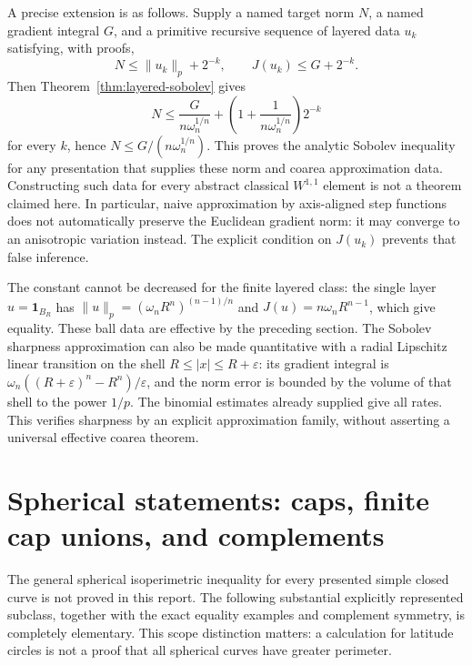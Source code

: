 A precise extension is as follows. Supply a named target norm \(N\),
a named gradient integral \(G\), and a primitive recursive sequence of
layered data \(u_k\) satisfying, with proofs,
\[
 N\leq\|u_k\|_p+2^{-k},\qquad J(u_k)\leq G+2^{-k}.
\]
Then Theorem~\ref{thm:layered-sobolev} gives
\[
 N\leq \frac{G}{n\omega_n^{1/n}}
       +\left(1+\frac1{n\omega_n^{1/n}}\right)2^{-k}
\]
for every \(k\), hence \(N\leq G/(n\omega_n^{1/n})\).
This proves the analytic Sobolev inequality for any presentation that
supplies these norm and coarea approximation data. Constructing such data
for every abstract classical \(W^{1,1}\) element is not a theorem claimed
here. In particular, naive approximation by axis-aligned step functions
does not automatically preserve the Euclidean gradient norm: it may
converge to an anisotropic variation instead. The explicit condition on
\(J(u_k)\) prevents that false inference.

The constant cannot be decreased for the finite layered class: the single
layer \(u=\mathbf1_{B_R}\) has
\(\|u\|_p=(\omega_nR^n)^{(n-1)/n}\) and
\(J(u)=n\omega_nR^{n-1}\), which give equality. These ball data are
effective by the preceding section. The Sobolev sharpness approximation
can also be made quantitative with a radial Lipschitz linear transition on the
shell \(R\leq|x|\leq R+\varepsilon\): its gradient integral is
\(\omega_n((R+\varepsilon)^n-R^n)/\varepsilon\), and the norm error
is bounded by the volume of that shell to the power \(1/p\). The
binomial estimates already supplied give all rates. This verifies
sharpness by an explicit approximation family, without asserting a
universal effective coarea theorem.

\section{Spherical statements: caps, finite cap unions, and complements}
\label{sec:spherical}

The general spherical isoperimetric inequality for every presented
simple closed curve is not proved in this report. The following
substantial explicitly represented subclass, together with the exact
equality examples and complement symmetry, is completely elementary.
This scope distinction matters: a calculation for latitude circles is
not a proof that all spherical curves have greater perimeter.

